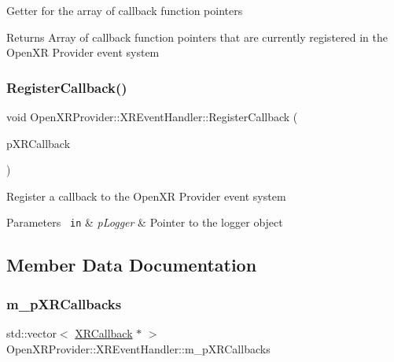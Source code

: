 Getter for the array of callback function pointers \begin{DoxyReturn}{Returns}
Array of callback function pointers that are currently registered in the Open\+XR Provider event system 
\end{DoxyReturn}
\mbox{\label{class_open_x_r_provider_1_1_x_r_event_handler_a027d2cf96cc56161e2db566733f984d5}} 
\subsubsection{\texorpdfstring{RegisterCallback()}{RegisterCallback()}}
{\footnotesize\ttfamily void Open\+X\+R\+Provider\+::\+X\+R\+Event\+Handler\+::\+Register\+Callback (\begin{DoxyParamCaption}\item[{\mbox{\hyperlink{struct_open_x_r_provider_1_1_x_r_callback}{X\+R\+Callback}} $\ast$}]{p\+X\+R\+Callback }\end{DoxyParamCaption})\hspace{0.3cm}{\ttfamily [inline]}}

Register a callback to the Open\+XR Provider event system 
\begin{DoxyParams}[1]{Parameters}
\mbox{\texttt{ in}}  & {\em p\+Logger} & Pointer to the logger object \\
\hline
\end{DoxyParams}


\subsection{Member Data Documentation}
\mbox{\label{class_open_x_r_provider_1_1_x_r_event_handler_ad0b2610427d3b8cff4ed01dff2baed95}} 
\subsubsection{\texorpdfstring{m\_pXRCallbacks}{m\_pXRCallbacks}}
{\footnotesize\ttfamily std\+::vector$<$ \mbox{\hyperlink{struct_open_x_r_provider_1_1_x_r_callback}{X\+R\+Callback}} $\ast$ $>$ Open\+X\+R\+Provider\+::\+X\+R\+Event\+Handler\+::m\+\_\+p\+X\+R\+Callbacks\hspace{0.3cm}{\ttfamily [private]}}



